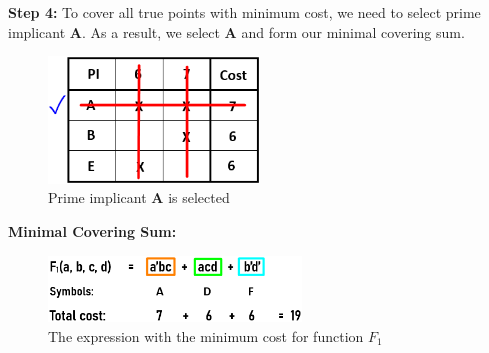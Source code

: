\documentclass[pdftex,12pt,a4paper]{article}
\begin{document}
\begin{enumerate}[label=\alph*)]
   \textbf{Step 4:} To cover all true points with minimum cost, we need to select prime implicant \textbf{A}. As a result, we select \textbf{A} and form our minimal covering sum.

   \begin{figure}[H]
    \centering
        \includegraphics[width=0.5\textwidth]{chart8.png}	
        \caption{Prime implicant \textbf{A} is selected}
        \label{fig1}
   \end{figure}

   \textbf{Minimal Covering Sum:}
   \begin{figure}[H]
    \centering
        \includegraphics[width=0.6\textwidth]{chart9.png}	
        \caption{The expression with the minimum cost for function $F_1$}
        \label{fig1}
   \end{figure}
\end{enumerate}
    
\newpage
\end{document}
